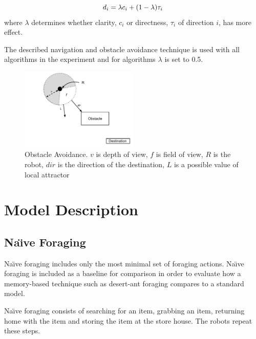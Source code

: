 \begin{equation}
	d_i= \lambda c_i + (1 - \lambda)\tau_i \\
	\label{eq:1}
\end{equation} where $\lambda$ determines whether clarity, $c_i$ or directness, $\tau_i$ of direction $i$, has more effect.
 
The described navigation and obstacle avoidance technique is used with all algorithms in the experiment and for algorithms $\lambda$ is set to 0.5.

\begin{figure}
	\centering
	\includegraphics[width=0.5\textwidth]{chapters/chapter3/figures/ObstacleAvoidance.pdf}
	\caption{Obstacle Avoidance. $v$ is depth of view, $f$ is field of view, $R$ is the robot, $dir$ is the direction of the destination, $L$ is a possible value of local attractor}
	\label{fig:obstacleavoidance}
\end{figure}


\section{Model Description}

\subsection{Na\"\i ve Foraging}

 Na\"\i ve foraging includes only the most minimal set of foraging actions. Na\"\i ve foraging is included as a baseline for comparison \cite{hoff2010two} \cite{ostergaard2001emergent} in order to evaluate how a memory-based technique such as desert-ant foraging compares to a standard model.

 Na\"\i ve foraging consists of searching for an item, grabbing an item, returning home with the item and storing the item at the store house. The robots repeat these steps. 

